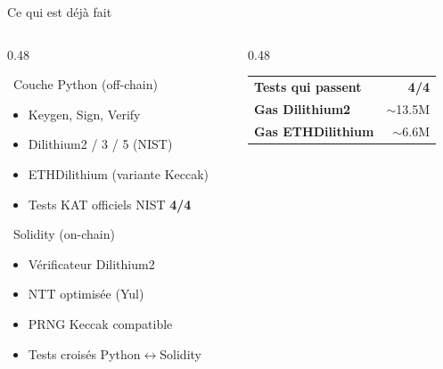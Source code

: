 \documentclass[aspectratio=169, 12pt]{beamer}
\begin{document}
\begin{frame}[shrink=10]{Ce qui est \textcolor{done_green}{déjà fait} \faCheckCircle}

  \begin{columns}[T]
    \begin{column}{0.48\textwidth}
      \begin{block}{\faCode\ Couche Python (off-chain)}
        \small
        \begin{itemize}\setlength\itemsep{1pt}
          \item[\checkmark] Keygen, Sign, Verify
          \item[\checkmark] Dilithium2 / 3 / 5 (NIST)
          \item[\checkmark] ETHDilithium (variante Keccak)
          \item[\checkmark] Tests KAT officiels NIST \textcolor{done_green}{\bfseries 4/4}
        \end{itemize}
      \end{block}
      \vspace{0.15cm}
      \begin{block}{\faEthereum\ Solidity (on-chain)}
        \small
        \begin{itemize}\setlength\itemsep{1pt}
          \item[\checkmark] Vérificateur Dilithium2
          \item[\checkmark] NTT optimisée (Yul)
          \item[\checkmark] PRNG Keccak compatible
          \item[\checkmark] Tests croisés Python$\leftrightarrow$Solidity
        \end{itemize}
      \end{block}
    \end{column}
    \begin{column}{0.48\textwidth}
      \begin{tcolorbox}[colback=done_bg, colframe=done_green,
        title={\bfseries\color{done_green} Chiffres clés},
        top=3pt, bottom=3pt]
        \renewcommand{\arraystretch}{1.2}
        \small
        \begin{tabular}{lr}
          \textbf{Tests qui passent} & \textcolor{done_green}{\bfseries 4/4} \\
          \textbf{Gas Dilithium2} & $\sim$13.5M \\
          \textbf{Gas ETHDilithium} & $\sim$6.6M \\

\end{tabular}
\end{tcolorbox}
\end{column}
\end{columns}
\end{frame}
\end{document}
